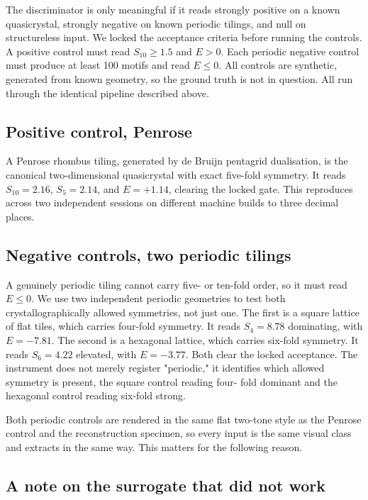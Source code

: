 \documentclass[11pt]{article}
\begin{document}
The discriminator is only meaningful if it reads strongly positive on a known
quasicrystal, strongly negative on known periodic tilings, and null on
structureless input. We locked the acceptance criteria before running the
controls. A positive control must read $S_{10} \geq 1.5$ and $E > 0$. Each
periodic negative control must produce at least 100 motifs and read $E \leq 0$.
All controls are synthetic, generated from known geometry, so the ground truth
is not in question. All run through the identical pipeline described above.

\subsection{Positive control, Penrose}

A Penrose rhombus tiling, generated by de Bruijn pentagrid dualisation, is the
canonical two-dimensional quasicrystal with exact five-fold symmetry. It reads
$S_{10} = 2.16$, $S_5 = 2.14$, and $E = +1.14$, clearing the locked gate. This
reproduces across two independent sessions on different machine builds to three
decimal places.

\subsection{Negative controls, two periodic tilings}

A genuinely periodic tiling cannot carry five- or ten-fold order, so it must
read $E \leq 0$. We use two independent periodic geometries to test both
crystallographically allowed symmetries, not just one. The first is a square
lattice of flat tiles, which carries four-fold symmetry. It reads $S_4 = 8.78$
dominating, with $E = -7.81$. The second is a hexagonal lattice, which carries
six-fold symmetry. It reads $S_6 = 4.22$ elevated, with $E = -3.77$. Both clear
the locked acceptance. The instrument does not merely register "periodic," it
identifies which allowed symmetry is present, the square control reading four-
fold dominant and the hexagonal control reading six-fold strong.

Both periodic controls are rendered in the same flat two-tone style as the
Penrose control and the reconstruction specimen, so every input is the same
visual class and extracts in the same way. This matters for the following
reason.

\subsection{A note on the surrogate that did not work}
\end{document}
